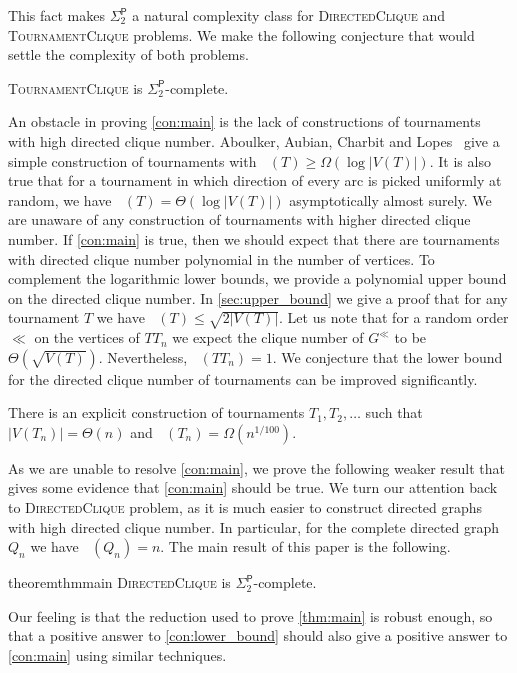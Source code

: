 \documentclass[a4paper,USenglish,cleveref,autoref,thm-restate,pdfa]{lipics-v2021}
\newcommand{\PHS}[1]{\ensuremath{\Sigma^\mathsf{P}_{#1}}\xspace}
\newcommand{\SPTWO}{\PHS{2}}
\newcommand{\Pdirclique}{\textsc{DirectedClique}\xspace}
\newcommand{\Ptourclique}{\textsc{TournamentClique}\xspace}
\newcommand{\norm}[1]{\left|#1\right|}
\newcommand{\ora}[1]{\overrightarrow{#1}}
\DeclareMathOperator{\diomega}{\ora \omega}
\begin{document}
This fact makes \SPTWO a natural complexity class for \Pdirclique and \Ptourclique problems.
We make the following conjecture that would settle the complexity of both problems.
\begin{conjecture}\label{con:main}
    \Ptourclique is \SPTWO-complete.
\end{conjecture}
An obstacle in proving \cref{con:main} is the lack of constructions of tournaments with high directed clique number.
Aboulker, Aubian, Charbit and Lopes~\cite{AboulkerACL23} give a simple construction of tournaments with $\diomega(T) \ge \Omega(\log \norm{V(T)})$.
It is also true that for a tournament in which direction of every arc is picked uniformly at random, we have $\diomega(T) = \Theta(\log \norm{V(T)})$ asymptotically almost surely.
We are unaware of any construction of tournaments with higher directed clique number.
If \cref{con:main} is true, then we should expect that there are tournaments with directed clique number polynomial in the number of vertices.
To complement the logarithmic lower bounds, we provide a polynomial upper bound on the directed clique number.
In \cref{sec:upper_bound} we give a proof that for any tournament $T$ we have $\diomega(T) \le \sqrt{2\norm{V(T)}}$.
Let us note that for a random order $\ll$ on the vertices of $TT_n$ we expect the clique number of $G^\ll$ to be $\Theta(\sqrt{V(T)})$.
Nevertheless, $\diomega(TT_n)=1$.
We conjecture that the lower bound for the directed clique number of tournaments can be improved significantly.
\begin{conjecture}\label{con:lower_bound}
    There is an explicit construction of tournaments $T_1,T_2,\ldots$ such that $\norm{V(T_n)} = \Theta(n)$ and $\diomega(T_n) = \Omega(n^{1/100})$.
\end{conjecture}

As we are unable to resolve \cref{con:main}, we prove the following weaker result that gives some evidence that \cref{con:main} should be true.
We turn our attention back to \Pdirclique problem, as it is much easier to construct directed graphs with high directed clique number.
In particular, for the complete directed graph $Q_n$ we have $\diomega(Q_n)=n$.
The main result of this paper is the following.
\begin{restatable}{theorem}{thmmain}\label{thm:main}
\Pdirclique is \SPTWO-complete.
\end{restatable}
Our feeling is that the reduction used to prove \cref{thm:main} is robust enough, so that a positive answer to \cref{con:lower_bound} should also give a positive answer to \cref{con:main} using similar techniques.
\end{document}
